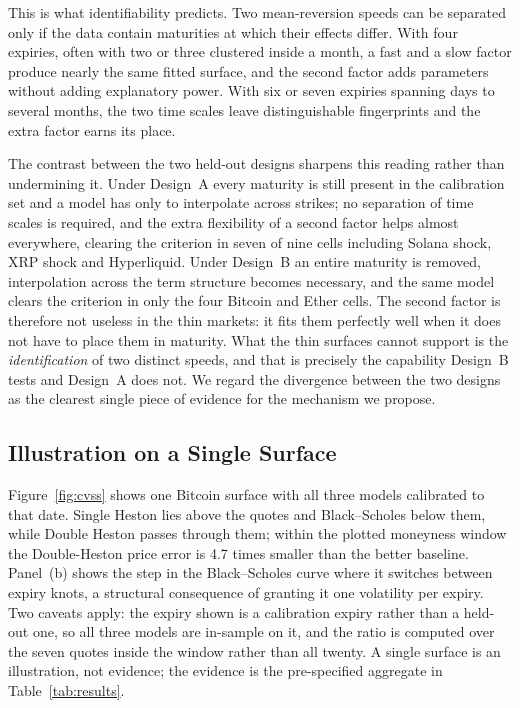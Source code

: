 \documentclass[runningheads]{llncs}
\begin{document}
This is what identifiability predicts. Two mean-reversion speeds can be
separated only if the data contain maturities at which their effects differ.
With four expiries, often with two or three clustered inside a month, a fast
and a slow factor produce nearly the same fitted surface, and the second factor
adds parameters without adding explanatory power. With six or seven expiries
spanning days to several months, the two time scales leave distinguishable
fingerprints and the extra factor earns its place.

The contrast between the two held-out designs sharpens this reading rather
than undermining it. Under Design~A every maturity
is still present in the calibration set and a model has only to interpolate
across strikes; no separation of time scales is required, and the extra
flexibility of a second factor helps almost everywhere, clearing the criterion
in seven of nine cells including Solana shock, XRP shock and Hyperliquid.
Under Design~B an entire maturity is removed, interpolation across the term
structure becomes necessary, and the same model clears the criterion in only
the four Bitcoin and Ether cells. The second factor is therefore not useless
in the thin markets: it fits them perfectly well when it does not have to
place them in maturity. What the thin surfaces cannot support is the
\emph{identification} of two distinct speeds, and that is precisely the
capability Design~B tests and Design~A does not. We regard the divergence
between the two designs as the clearest single piece of evidence for the
mechanism we propose.

\subsection{Illustration on a Single Surface}

Figure~\ref{fig:cvss} shows one Bitcoin surface with all three models
calibrated to that date. Single Heston lies above the quotes and
Black--Scholes below them, while Double Heston passes through them; within the
plotted moneyness window the Double-Heston price error is 4.7 times smaller
than the better baseline. Panel~(b) shows the step in the Black--Scholes curve
where it switches between expiry knots, a structural consequence of granting it
one volatility per expiry. Two caveats apply: the expiry shown is a
calibration expiry rather than a held-out one, so all three models are
in-sample on it, and the ratio is computed over the seven quotes inside the
window rather than all twenty. A single surface is an illustration, not
evidence; the evidence is the pre-specified aggregate in
Table~\ref{tab:results}.
\end{document}
